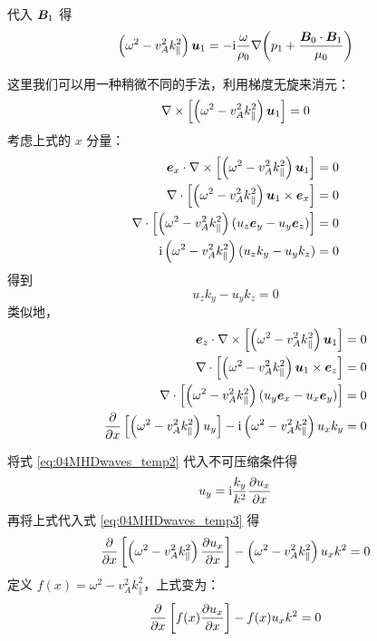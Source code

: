 代入 $\bm{B}_1$ 得
\begin{equation}
\left( \omega^2 - v_A^2 k_\parallel^2 \right) \bm{u}_1
= - \mathrm{i} \frac{\omega}{\rho_0} \nabla {\left( p_1 + \frac{\bm{B}_0 \cdot \bm{B}_1}{\mu_0} \right)}
\end{equation}

这里我们可以用一种稍微不同的手法，利用梯度无旋来消元：
\begin{equation}
\nabla \times {\left[ \left( \omega^2 - v_A^2 k_\parallel^2 \right) \bm{u}_1 \right]} = 0
\end{equation}
考虑上式的 $x$ 分量：
\begin{equation}\begin{aligned}
\bm{e}_x \cdot \nabla \times {\left[ \left( \omega^2 - v_A^2 k_\parallel^2 \right) \bm{u}_1 \right]} &= 0 \\
\nabla \cdot {\left[ \left( \omega^2 - v_A^2 k_\parallel^2 \right) \bm{u}_1 \times \bm{e}_x \right]} &= 0 \\
\nabla \cdot {\left[ \left( \omega^2 - v_A^2 k_\parallel^2 \right) \left( u_z \bm{e}_y - u_y \bm{e}_z \right) \right]} &= 0 \\
\mathrm{i} \left( \omega^2 - v_A^2 k_\parallel^2 \right) \left( u_z k_y - u_y k_z \right) &= 0
\end{aligned}\end{equation}
得到
\begin{equation}\label{eq:04MHDwaves_temp2}
u_z k_y - u_y k_z = 0
\end{equation}
类似地，
\begin{equation}\begin{aligned}\label{eq:04MHDwaves_temp3}
\bm{e}_z \cdot \nabla \times {\left[ \left( \omega^2 - v_A^2 k_\parallel^2 \right) \bm{u}_1 \right]} &= 0 \\
\nabla \cdot {\left[ \left( \omega^2 - v_A^2 k_\parallel^2 \right) \bm{u}_1 \times \bm{e}_z \right]} &= 0 \\
\nabla \cdot {\left[ \left( \omega^2 - v_A^2 k_\parallel^2 \right) \left( u_y \bm{e}_x - u_x \bm{e}_y \right) \right]} &= 0 \\
\frac{\partial {}}{\partial {x}} \left[ \left( \omega^2 - v_A^2 k_\parallel^2 \right) u_y \right]
- \mathrm{i} \left( \omega^2 - v_A^2 k_\parallel^2 \right) u_x k_y &= 0
\end{aligned}\end{equation}

将式 \ref{eq:04MHDwaves_temp2} 代入不可压缩条件得
\begin{equation}
u_y = \mathrm{i} \frac{k_y}{k^2} \frac{\partial {u_x}}{\partial {x}}
\end{equation}
再将上式代入式 \ref{eq:04MHDwaves_temp3} 得
\begin{equation} \label{eq:04MHDwaves_temp4}
\frac{\partial {}}{\partial {x}} \left[ \left( \omega^2 - v_A^2 k_\parallel^2 \right) \frac{\partial {u_x}}{\partial {x}} \right]
- \left( \omega^2 - v_A^2 k_\parallel^2 \right) u_x k^2
= 0
\end{equation}
定义 $f(x) = \omega^2 - v_A^2 k_\parallel^2$，上式变为：
\begin{equation}
\frac{\partial {}}{\partial {x}} \left[ f(x) \frac{\partial {u_x}}{\partial {x}} \right]
- f(x) u_x k^2
= 0
\end{equation}

